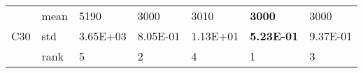 \begin{table}[]
\begin{tabular}{|l|l|l|l|l|l|l|}
\multirow{3}{*}{C30} & mean & 5190              & 3000              & 3010              & \textbf{3000}     & 3000              \\ \cline{2-7} 
                     & std  & 3.65E+03          & 8.05E-01          & 1.13E+01          & \textbf{5.23E-01} & 9.37E-01          \\ \cline{2-7} 
                     & rank & 5                 & 2                 & 4                 & 1                 & 3                 \\ \hline
\end{tabular}
\end{table}